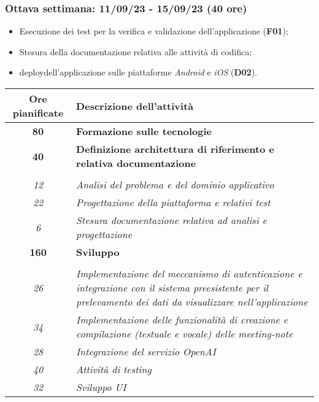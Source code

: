 \subsubsection{Ottava settimana: 11/09/23 - 15/09/23 (40 ore)}
    \begin{itemize}
        \item Esecuzione dei test per la verifica e validazione dell'applicazione (\textbf{F01});
        \item Stesura della documentazione relativa alle attività di codifica;
        \item \Gls{deploy}\glsoccur dell'applicazione sulle piattaforme \emph{Android} e \emph{iOS} (\textbf{D02}).
    \end{itemize}

    \begin{table}
        \centering
        \begin{tabularx}{\textwidth}{|c|X|}
            \hline
            \textbf{Ore pianificate} & \textbf{Descrizione dell'attività} \\\hline
            
            \textbf{80} & \textbf{Formazione sulle tecnologie} \\	 
            \hline
            
            \textbf{40} & \textbf{Definizione architettura di riferimento e relativa documentazione} \\ \hdashline 
            \multirow{3}{0cm}\\ 
            \textit{12} & 
            \textit{Analisi del problema e del dominio applicativo} \\
            \textit{22} & 
            \textit{Progettazione della piattaforma e relativi test} \\
            \textit{6} & 
            \textit{Stesura documentazione relativa ad analisi e progettazione} \\
            \hline
            
    
            \textbf{160} & \textbf{Sviluppo}  \\ \hdashline 
            \multirow{5}{0cm}\\ 
            \textit{26} & 
            \textit{Implementazione del meccanismo di autenticazione e integrazione con il sistema preesistente per il prelevamento dei dati da visualizzare nell'applicazione} \\
            \textit{34} & 
            \textit{Implementazione delle funzionalità di creazione e compilazione (testuale e vocale) delle meeting-note} \\
            \textit{28} & 
            \textit{Integrazione del servizio OpenAI} \\
            \textit{40} & 
            \textit{Attività di testing} \\
            \textit{32} & 
            \textit{Sviluppo UI} \\
            \hline
            

\end{tabularx}
\end{table}
